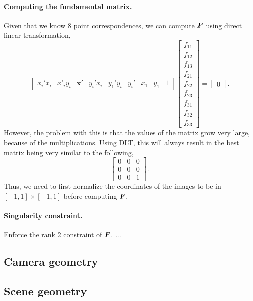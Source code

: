 \paragraph{Computing the fundamental matrix.}

Given that we know 8 point correspondences, we can compute $\bm{F}$ using direct
linear transformation, \[
  \begin{bmatrix}
    x_i'x_i & x'_iy_i & \bm{x}' & y_i'x_i & y_1'y_i & y_i' & x_1 & y_1 & 1
  \end{bmatrix}
  \begin{bmatrix}
    f_{11} \\
    f_{12} \\
    f_{13} \\
    f_{21} \\
    f_{22} \\
    f_{23} \\
    f_{31} \\
    f_{32} \\
    f_{33}
  \end{bmatrix}
  = \begin{bmatrix} 0 \end{bmatrix}
.\]
However, the problem with this is that the values of the matrix grow very
large, because of the multiplications. Using DLT, this will always result in
the best matrix being very similar to the following, \[
  \begin{bmatrix}
    0 & 0 & 0 \\
    0 & 0 & 0 \\
    0 & 0 & 1
  \end{bmatrix}
.\]
Thus, we need to first normalize the coordinates of the images to be in $[-1,
1]\times[-1, 1]$ before computing $\bm{F}$.

\paragraph{Singularity constraint.}

Enforce the rank 2 constraint of $\bm{F}$. ...

\subsection{Camera geometry}

\subsection{Scene geometry}
